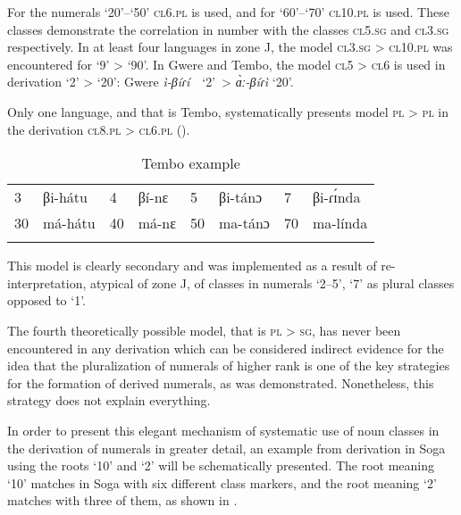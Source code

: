 For the numerals ‘20’–‘50’ \textsc{cl}6.\textsc{pl} is used, and for ‘60’–‘70’ \textsc{cl}10.\textsc{pl} is used. These classes demonstrate the correlation in number with the classes \textsc{cl}5.\textsc{sg} and \textsc{cl}3.\textsc{sg} respectively. In at least four languages in zone J, the model \textsc{cl}3.\textsc{sg} > \textsc{cl}10.\textsc{pl} was encountered for ‘9’ > ‘90’. In Gwere and Tembo, the model \textsc{cl}5 > \textsc{cl}6 is used in derivation ‘2’ > ‘20’: Gwere \textit{ì-β}\textit{íɾí}~~‘2’~>  \textit{{\`{ɑ}}ː-β}\textit{íɾì} ‘20’. 

Only one language, and that is Tembo, systematically presents model \textsc{pl} > \textsc{pl} in the derivation \textsc{cl}8.\textsc{pl}  > \textsc{cl}6.\textsc{pl} ().


\begin{table}
\caption{\label{tab:1:24} Tembo example}

\begin{tabularx}{\textwidth}{lX lX lX lX}
\lsptoprule

3 &  βi-hátu & 4 &  βí-nɛ & 5 &  βi-tánɔ & 7 &  βi-ɾ{\'{ɪ}}nda\\
30 & má-hátu & 40 & má-nɛ & 50 & ma-tánɔ & 70 & ma-línda\\
\lspbottomrule
\end{tabularx}
\end{table}


\newpage 
This model is clearly secondary and was implemented as a result of re-interpre\-tation, atypical of zone J, of classes in numerals ‘2--5’, ‘7’ as plural classes opposed to ‘1’. 

The fourth theoretically possible model, that is \textsc{pl} > \textsc{sg}, has never been encountered in any derivation which can be considered indirect evidence for the idea that the pluralization of numerals of higher rank is one of the key strategies for the formation of derived numerals, as was demonstrated. Nonetheless, this strategy does not explain everything. 

In order to present this elegant mechanism of systematic use of noun classes in the derivation of numerals in greater detail, an example from derivation in Soga using the roots `10' and `2' will be schematically presented. The root meaning `10' matches in Soga with six different class markers, and the root meaning ‘2’ matches with three of them, as shown in . 
 







